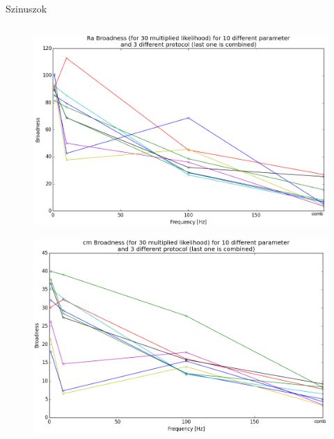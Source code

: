 \documentclass{beamer}
\begin{document}
\begin{darkframes}
\begin{frame}
\begin{center}
	\Large \alert{Szinuszok}
\end{center}
\end{frame}

\begin{frame}
\begin{columns}[T]
\begin{column}{.5\textwidth}
	\begin{figure}
		\centering
		\includegraphics[width=\textwidth]{comb/zaps/Ra_brod.png}
	\end{figure}
	\begin{figure}
		\centering
		\includegraphics[width=\textwidth]{comb/zaps/cm_brod.png}
	\end{figure}
	

\end{column}
\end{columns}
\end{frame}
\end{darkframes}
\end{document}
